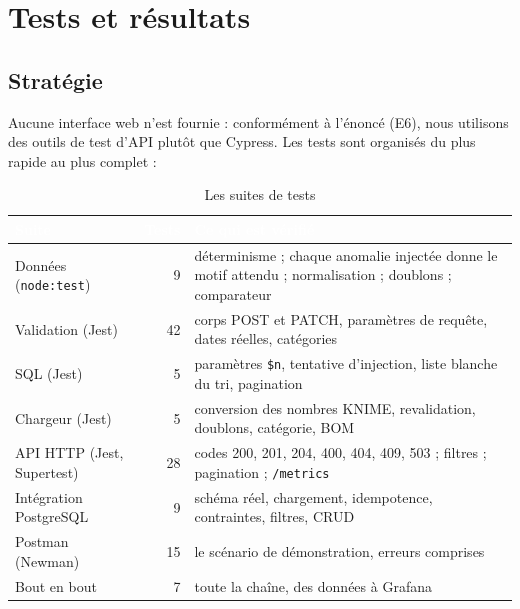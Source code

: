 \chapter{Tests et résultats}\label{chap:tests}

\section{Stratégie}
Aucune interface web n'est fournie : conformément à l'énoncé (E6), nous utilisons des outils de
test d'API plutôt que Cypress. Les tests sont organisés du plus rapide au plus complet :

\begin{table}[H]
\centering\small
\caption{Les suites de tests}
\begin{tabularx}{\linewidth}{|l|r|X|}
\hline
\rowcolor{bluedark}\textcolor{white}{\textbf{Suite}} & \textcolor{white}{\textbf{Tests}} & \textcolor{white}{\textbf{Ce qui est vérifié}} \\
\hline
Données (\texttt{node:test}) & 9 & déterminisme ; chaque anomalie injectée donne le motif attendu ; normalisation ; doublons ; comparateur \\
\hline
Validation (Jest) & 42 & corps POST et PATCH, paramètres de requête, dates réelles, catégories \\
\hline
SQL (Jest) & 5 & paramètres \texttt{\$n}, tentative d'injection, liste blanche du tri, pagination \\
\hline
Chargeur (Jest) & 5 & conversion des nombres KNIME, revalidation, doublons, catégorie, BOM \\
\hline
API HTTP (Jest, Supertest) & 28 & codes 200, 201, 204, 400, 404, 409, 503 ; filtres ; pagination ; \texttt{/metrics} \\
\hline
Intégration PostgreSQL & 9 & schéma réel, chargement, idempotence, contraintes, filtres, CRUD \\
\hline
Postman (Newman) & 15 & le scénario de démonstration, erreurs comprises \\
\hline
Bout en bout & 7 & toute la chaîne, des données à Grafana \\
\hline
\end{tabularx}
\end{table}

